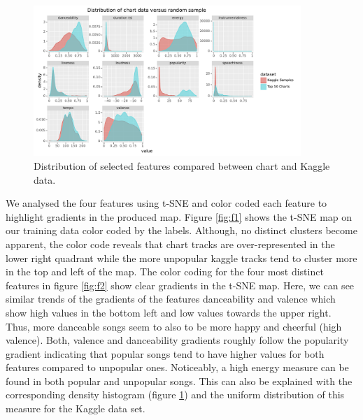 \documentclass{article}
\begin{document}
\begin{figure}
    \centering
    \includegraphics[width=0.9\textwidth]{code/fig/Charts_vs_random_samples.pdf}
    \caption{Distribution of selected features compared between chart and Kaggle data.}
    \label{densities}
\end{figure}

We analysed the four features using t-SNE and color coded each feature to highlight gradients in the produced map. Figure \ref{fig:f1} shows the t-SNE map on our training data color coded by the labels. Although, no distinct clusters become apparent, the color code reveals that chart tracks are over-represented in the lower right quadrant while the more unpopular kaggle tracks tend to cluster more in the top and left of the map. The color coding for the four most distinct features in figure \ref{fig:f2} show clear gradients in the t-SNE map. Here, we can see similar trends of the gradients of the features danceability and valence which show high values in the bottom left and low values towards the upper right. Thus, more danceable songs seem to also to be more happy and cheerful (high valence). Both, valence and danceability gradients roughly follow the popularity gradient indicating that popular songs tend to have higher values for both features compared to unpopular ones. Noticeably, a high energy measure can be found in both popular and unpopular songs. This can also be explained with the corresponding density histogram (figure \ref{densities}) and the uniform distribution of this measure for the Kaggle data set.
\end{document}
